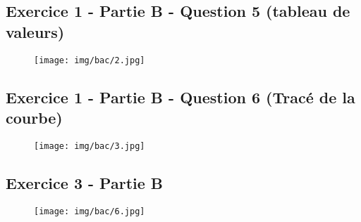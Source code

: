 \documentclass[answers]{exam}
\begin{document}
\subsection*{Exercice 1 - Partie B - Question 5 (tableau de valeurs)}

\begin{figure}[H]
  \centering
  \texttt{[image: img/bac/2.jpg]}
\end{figure}

\subsection*{Exercice 1 - Partie B - Question 6 (Tracé de la courbe)}

\begin{figure}[H]
  \centering
  \texttt{[image: img/bac/3.jpg]}
\end{figure}

\subsection*{Exercice 3 - Partie B}

\begin{figure}[H]
  \centering
  \texttt{[image: img/bac/6.jpg]}
\end{figure}
\end{document}
